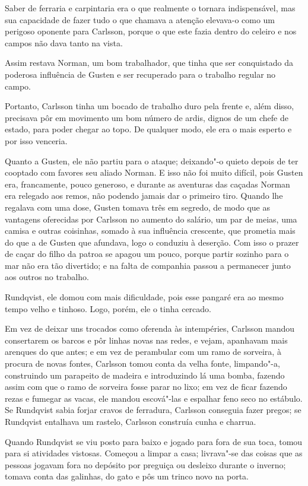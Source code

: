 Saber de ferraria e carpintaria era o que realmente o tornara indispensável,
mas sua capacidade de fazer tudo o que chamava a atenção elevava-o como
um perigoso oponente para Carlsson, porque o que este fazia dentro
do celeiro e nos campos não dava tanto na vista.

Assim restava Norman, um bom trabalhador, que tinha que ser conquistado da
poderosa influência de Gusten e ser recuperado para o trabalho regular no campo.

Portanto, Carlsson tinha um bocado de trabalho duro pela frente e, além disso,
precisava pôr em movimento um bom número de ardis, dignos de um chefe de estado,
para poder chegar ao topo. De qualquer modo, ele era o mais esperto e por isso venceria. 

Quanto a Gusten, ele não partiu para o ataque; deixando"-o quieto depois de ter
cooptado com favores seu aliado Norman. E isso não foi muito difícil, pois
Gusten era, francamente, pouco generoso, e durante as aventuras das caçadas
Norman era relegado aos remos, não podendo jamais dar o primeiro tiro. Quando
lhe regalava com uma dose, Gusten tomava três em segredo, de modo que as
vantagens oferecidas por Carlsson no aumento do salário, um par de meias, uma
camisa e outras coisinhas, somado à sua influência crescente, que prometia mais
do que a de Gusten que afundava, logo o conduziu à deserção. Com isso o
prazer de caçar do filho da patroa se apagou um pouco, porque partir sozinho
para o mar não era tão divertido; e na falta de companhia passou a permanecer
junto aos outros no trabalho.

Rundqvist, ele domou com mais dificuldade, pois esse pangaré era ao mesmo tempo
velho e tinhoso. Logo, porém, ele o tinha cercado.

Em vez de deixar uns trocados como oferenda às intempéries, Carlsson mandou consertarem os
barcos e pôr linhas novas nas redes, e vejam, apanhavam mais arenques do que
antes; e em vez de perambular com um ramo de sorveira, à procura de novas
fontes, Carlsson tomou conta da velha fonte, limpando"-a, construindo um
parapeito de madeira e introduzindo lá uma bomba, fazendo assim com que o ramo
de sorveira fosse parar no lixo; em vez de ficar fazendo rezas e fumegar as
vacas, ele mandou escová"-las e espalhar feno seco no estábulo. Se Rundqvist
sabia forjar cravos de ferradura, Carlsson conseguia fazer pregos; se Rundqvist
entalhava um rastelo, Carlsson construía cunha e charrua.

Quando Rundqvist se viu posto para baixo e jogado para fora de sua toca, tomou
para si atividades vistosas. Começou a limpar a casa; livrava"-se das coisas que
as pessoas jogavam fora no depósito por preguiça ou desleixo durante o inverno;
tomava conta das galinhas, do gato e pôs um trinco novo na porta.

